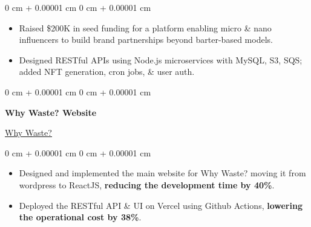 \documentclass[10pt, a4paper]{article}
\newenvironment{highlights}{
    \begin{itemize}[
        topsep=0 cm,
        parsep=0 cm,
        partopsep=0pt,
        itemsep=0pt,
        leftmargin=0 cm + 10pt
    ]
}{
    \end{itemize}
} %
\newenvironment{onecolentry}{
    \begin{adjustwidth}{
        0 cm + 0.00001 cm
    }{
        0 cm + 0.00001 cm
    }
}{
    \end{adjustwidth}
} %
\newenvironment{twocolentry}[2][]{
    \onecolentry
    \def\secondColumn{#2}
    \setcolumnwidth{\fill, 6.0 cm}
    \begin{paracol}{2}
}{
    \switchcolumn \raggedleft \secondColumn
    \end{paracol}
    \endonecolentry
} %
\begin{document}
        \vspace{0.10 cm}
        \begin{onecolentry}
            \begin{highlights}
                \item Raised \$200K in seed funding for a platform enabling micro \& nano influencers to build brand partnerships beyond barter-based models.
                \item Designed RESTful APIs using Node.js microservices with MySQL, S3, SQS; added NFT generation, cron jobs, \& user auth. 
            \end{highlights}
        \end{onecolentry}

        \vspace{0.10 cm}
        \begin{twocolentry}{
            \href{https://www.whywaste.io/}{\underline{Why Waste?}}
        }
            \textbf{Why Waste? Website}
        \end{twocolentry}

        \vspace{0.10 cm}
        \begin{onecolentry}
            \begin{highlights}
                \item Designed and implemented the main website for Why Waste? moving it from wordpress to ReactJS, \textbf{reducing the development time by 40\%}. 
                \item Deployed the RESTful API \& UI on Vercel using Github Actions, \textbf{lowering the operational cost by 38\%}.
            \end{highlights}
        \end{onecolentry}


        \vspace{0.10 cm}


\end{document}
